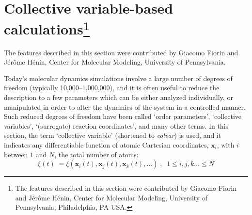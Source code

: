 
\section{Collective variable-based calculations\footnote{ The features described in this section were contributed by Giacomo Fiorin and J\'er\^ome H\'enin, Center for Molecular Modeling, University of Pennsylvania, Philadelphia, PA USA.}}
\label{section:colvars}

The features described in this section were contributed by Giacomo Fiorin and J\'er\^ome H\'enin, Center for Molecular Modeling, University of Pennsylvania.

Today's molecular dynamics simulations involve a large number of
degrees of freedom (typically 10,000--1,000,000), and it is often
useful to reduce the description to a few parameters which can be
either analyzed individually, or manipulated in order to alter the
dynamics of the system in a controlled manner.  Such reduced degrees
of freedom have been called `order parameters', `collective
variables', `(surrogate) reaction coordinates', and many other terms.
In this section, the term `collective variable' (shortened to
\textit{colvar}) is used, and it indicates any differentiable function
of atomic Cartesian coordinates, $\bm{x}_{i}$, with $i$ between
$1$ and $N$, the total number of atoms:
\begin{equation} 
  \label{eq:colvar_basic}
  \xi(t) \; = \xi\left(\bm{x}_{i}(t), \bm{x}_{j}(t), \bm{x}_{k}(t),
  \ldots \right)\;, \;\; 1 \leq i,j,k\ldots \leq N
\end{equation}

